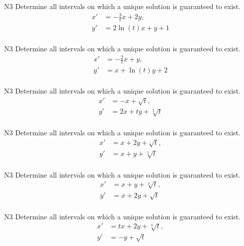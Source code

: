 
\begin{problem}{N3}
Determine all intervals on which a unique solution is guaranteed to exist.
\begin{align*}
x' & = -\frac{3}{t}x + 2y,\\
y' & = 2\ln(t)x + y + 1\\
\end{align*}
\end{problem}

\begin{problem}{N3}
Determine all intervals on which a unique solution is guaranteed to exist.
\begin{align*}
x' & = -\frac{2}{t}x + y,\\
y' & = x + \ln(t)y + 2\\
\end{align*}
\end{problem}

\begin{problem}{N3}
Determine all intervals on which a unique solution is guaranteed to exist.
\begin{align*}
x' & = -x + \sqrt{t},\\
y' & = 2x + ty + \sqrt[3]{t}\\
\end{align*}
\end{problem}

\begin{problem}{N3}
Determine all intervals on which a unique solution is guaranteed to exist.
\begin{align*}
x' & = x + 2y + \sqrt{t},\\
y' & = x + y + \sqrt[3]{t}\\
\end{align*}
\end{problem}

\begin{problem}{N3}
Determine all intervals on which a unique solution is guaranteed to exist.
\begin{align*}
x' & = x + y + \sqrt[3]{t},\\
y' & = x + 2y + \sqrt{t}\\
\end{align*}
\end{problem}

\begin{problem}{N3}
Determine all intervals on which a unique solution is guaranteed to exist.
\begin{align*}
x' & = tx + 2y + \sqrt[3]{t},\\
y' & = -y + \sqrt{t}\\
\end{align*}
\end{problem}

